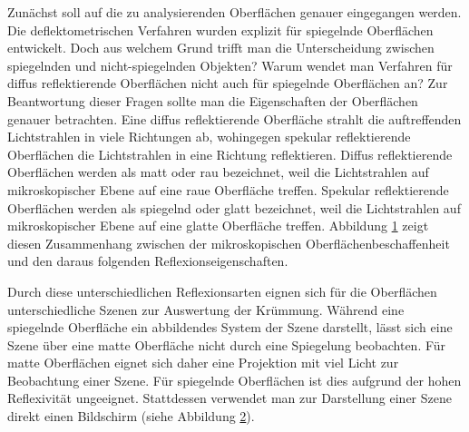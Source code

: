 Zunächst soll auf die zu analysierenden Oberflächen genauer eingegangen werden.
Die deflektometrischen Verfahren wurden explizit für spiegelnde Oberflächen entwickelt.
Doch aus welchem Grund trifft man die Unterscheidung zwischen spiegelnden und nicht-spie\-geln\-den Objekten?
Warum wendet man Verfahren für diffus reflektierende Oberflächen nicht auch für spiegelnde Oberflächen an?
Zur Beantwortung dieser Fragen sollte man die Eigenschaften der Oberflächen genauer betrachten.
Eine diffus reflektierende Oberfläche strahlt die auftreffenden Lichtstrahlen in viele Richtungen ab, wohingegen spekular reflektierende Oberflächen die Lichtstrahlen in eine Richtung reflektieren.
Diffus reflektierende Oberflächen werden als matt oder rau bezeichnet, weil die Lichtstrahlen auf mikroskopischer Ebene auf eine raue Oberfläche treffen.
Spekular reflektierende Oberflächen werden als spiegelnd oder glatt bezeichnet, weil die Lichtstrahlen auf mikroskopischer Ebene auf eine glatte Oberfläche treffen.
Abbildung \ref{tikz:abbGlattUndRau} zeigt diesen Zusammenhang zwischen der mikroskopischen Oberflächenbeschaffenheit und den daraus folgenden Reflexionseigenschaften.

{
	\begin{figure}[H]
		\centering
		
		\label{tikz:abbGlattUndRau}
	\end{figure}
}
%
\noindent
Durch diese unterschiedlichen Reflexionsarten eignen sich für die Oberflächen unterschiedliche Szenen zur Auswertung der Krümmung.
Während eine spiegelnde Oberfläche ein abbildendes System der Szene darstellt, lässt sich eine Szene über eine matte Oberfläche nicht durch eine Spiegelung beobachten.
Für matte Oberflächen eignet sich daher eine Projektion mit viel Licht zur Beobachtung einer Szene.
Für spiegelnde Oberflächen ist dies aufgrund der hohen Reflexivität ungeeignet.
Stattdessen verwendet man zur Darstellung einer Szene direkt einen Bildschirm (siehe Abbildung  \ref{tikz:abbDeflektometrieVSProjektion}).

{
	\begin{figure}[H]
		\centering
		
		\label{tikz:abbDeflektometrieVSProjektion}
	\end{figure}
}


